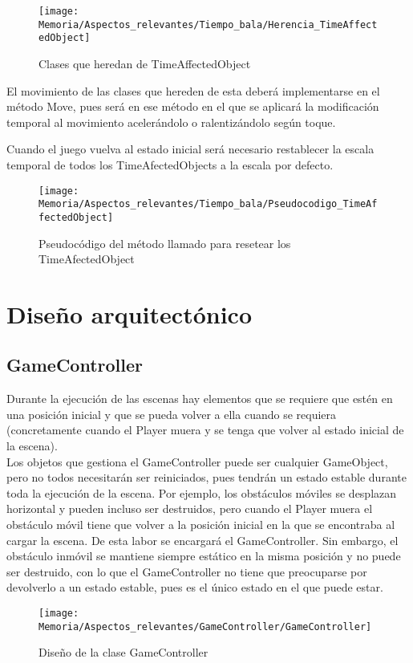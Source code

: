 \begin{figure}[h]
\texttt{[image: Memoria/Aspectos\_relevantes/Tiempo\_bala/Herencia\_TimeAffectedObject]}
\caption{Clases que heredan de TimeAffectedObject}
\end{figure}

El movimiento de las clases que hereden de esta deberá implementarse en el método Move, pues será en ese método en el que se aplicará la modificación temporal al movimiento acelerándolo o ralentizándolo según toque.

Cuando el juego vuelva al estado inicial será necesario restablecer la escala temporal de todos los TimeAfectedObjects a la escala por defecto.

\begin{figure}[h]
\texttt{[image: Memoria/Aspectos\_relevantes/Tiempo\_bala/Pseudocodigo\_TimeAffectedObject]}
\caption{Pseudocódigo del método llamado para resetear los TimeAfectedObject}
\end{figure} 

\section{Diseño arquitectónico}
\subsection{GameController}
Durante la ejecución de las escenas hay elementos que se requiere que estén en una posición inicial y que se pueda volver a ella cuando se requiera (concretamente cuando el Player muera y se tenga que volver al estado inicial de la escena).\\
Los objetos que gestiona el GameController puede ser cualquier GameObject, pero no todos necesitarán ser reiniciados, pues tendrán un estado estable durante toda la ejecución de la escena. Por ejemplo, los obstáculos móviles se desplazan horizontal y pueden incluso ser destruidos, pero cuando el Player muera el obstáculo móvil tiene que volver a la posición inicial en la que se encontraba al cargar la escena. De esta labor se encargará el GameController. Sin embargo, el obstáculo inmóvil se mantiene siempre estático en la misma posición y no puede ser destruido, con lo que el GameController no tiene que preocuparse por devolverlo a un estado estable, pues es el único estado en el que puede estar.

\begin{figure}[h]
\centering
\texttt{[image: Memoria/Aspectos\_relevantes/GameController/GameController]}
\caption{Diseño de la clase GameController}
\end{figure}

